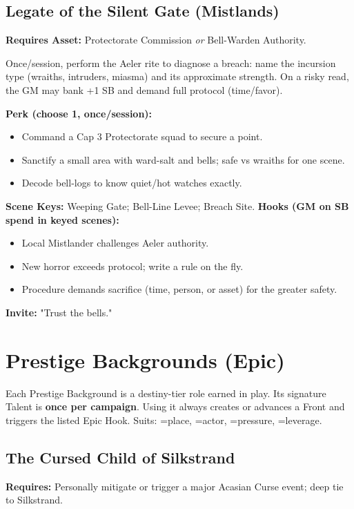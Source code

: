 \subsection{Legate of the Silent Gate (Mistlands)}
\textbf{Requires Asset:} Protectorate Commission \emph{or} Bell-Warden Authority.
\begin{tcolorbox}[enhanced,sharp corners,boxrule=.6pt,title={Talent — Breath-Test (8 XP)}]
Once/session, perform the Aeler rite to diagnose a breach: name the incursion type (wraiths, intruders, miasma) and its approximate strength. On a risky read, the GM may bank +1 SB and demand full protocol (time/favor).
\end{tcolorbox}
\textbf{Perk (choose 1, once/session):}
\begin{itemize}
  \item Command a Cap 3 Protectorate squad to secure a point.
  \item Sanctify a small area with ward-salt and bells; safe vs wraiths for one scene.
  \item Decode bell-logs to know quiet/hot watches exactly.
\end{itemize}
\textbf{Scene Keys:} Weeping Gate; Bell-Line Levee; Breach Site.
\textbf{Hooks (GM on SB spend in keyed scenes):}
\begin{itemize}
  \item Local Mistlander challenges Aeler authority.
  \item New horror exceeds protocol; write a rule on the fly.
  \item Procedure demands sacrifice (time, person, or asset) for the greater safety.
\end{itemize}
\textbf{Invite:} "Trust the bells."

\section{Prestige Backgrounds (Epic)}

Each Prestige Background is a destiny-tier role earned in play. Its signature Talent is \textbf{once per campaign}. Using it always creates or advances a Front and triggers the listed Epic Hook. Suits: \SuitSpade=place, \SuitHeart=actor, \SuitClub=pressure, \SuitDiamond=leverage.

\subsection{The Cursed Child of Silkstrand}
\textbf{Requires:} Personally mitigate or trigger a major Acasian Curse event; deep tie to Silkstrand.

